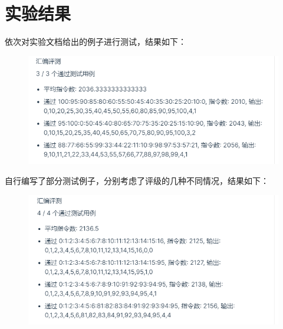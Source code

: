 \documentclass[12pt, a4paper, oneside]{ctexart}
\begin{document}
\section*{实验结果}
依次对实验文档给出的例子进行测试，结果如下：
\begin{figure}[H]
    \centering
    \includegraphics[scale=0.8]{Output1.png}
\end{figure}
自行编写了部分测试例子，分别考虑了评级的几种不同情况，结果如下：
\begin{figure}[H]
    \centering
    \includegraphics[scale=0.8]{Output2.png}
\end{figure}
\end{document}
